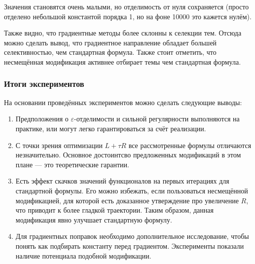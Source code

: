 \documentclass[12pt]{article}
\begin{document}
Значения становятся очень малыми, но отделимость от нуля сохраняется (просто отделено небольшой константой порядка 1, но на фоне 10000 это кажется нулём). 

Также видно, что градиентные методы более склонны к селекции тем. Отсюда можно сделать вывод, что градиентное направление обладает большей селективностью, чем стандартная формула. Также стоит отметить, что несмещённая модификация активнее отбирает темы чем стандартная формула.
\subsubsection{Итоги экспериментов}
На основании проведённых экспериментов можно сделать следующие выводы:
\begin{enumerate}
\item Предположения о $\varepsilon$-отделимости и сильной регулярности выполняются на практике, или могут легко гарантироваться за счёт реализации.
\item С точки зрения оптимизации $L + \tau R$ все рассмотренные формулы отличаются незначительно. Основное достоинтсво предложенных модификаций в этом плане --- это теоретические гарантии.
\item Есть эффект скачков значений функционалов на первых итерациях для стандартной формулы. Его можно избежать, если пользоваться несмещённой модификацией, для которой есть доказанное утверждение про увеличение $R$, что приводит к более гладкой траектории. Таким образом, данная модификация явно улучшает стандартную формулу.
\item Для градиентных поправок необходимо дополнительное исследование, чтобы понять как подбирать константу перед градиентом. Эксперименты показали наличие потенциала подобной модификации.
\end{enumerate}
\end{document}
